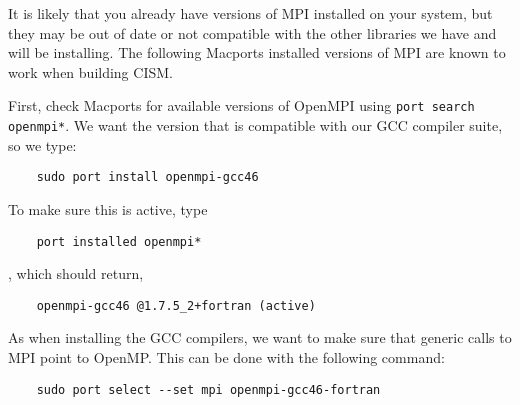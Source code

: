 \begin{mdframed}[style=mac] %
It is likely that you already have versions of MPI installed on your system, 
but they may be out of date or not compatible with the other libraries we have 
and will be installing. The following Macports installed versions of MPI are known 
to work when building  CISM.

%
%
%

First, check Macports for available versions of OpenMPI using \texttt{port search openmpi*}. We want 
the version that is compatible with our GCC compiler suite, so we type: 

\begin{verbatim}
	sudo port install openmpi-gcc46
\end{verbatim}

To make sure this is active, type 
\begin{verbatim}
	port installed openmpi*
\end{verbatim}

, which should return, 

\begin{verbatim}
	openmpi-gcc46 @1.7.5_2+fortran (active)
\end{verbatim}

As when installing the GCC compilers, we want to make sure that generic calls to MPI point to OpenMP. This 
can be done with the following command:

\begin{verbatim}
	sudo port select --set mpi openmpi-gcc46-fortran
\end{verbatim}

%
%

\end{mdframed}              %




